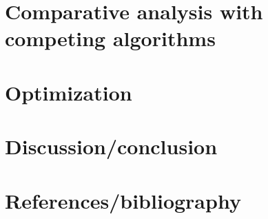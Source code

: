 \documentclass{report}
\begin{document}
\section*{Comparative analysis with competing algorithms} 

\section*{Optimization}

\section*{Discussion/conclusion}

\section*{References/bibliography}
\end{document}
